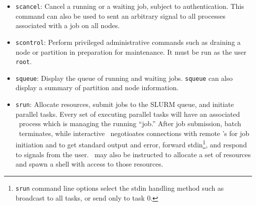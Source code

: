 \begin{itemize}
\item {\tt scancel}: Cancel a running or a waiting job, subject to
authentication. This command can also be used to sent an arbitrary 
signal to all processes associated with a job on all nodes.

\item {\tt scontrol}: Perform privileged administrative commands
such as draining a node or partition in preparation for maintenance. 
It must be run as the user {\tt root}.

\item {\tt squeue}: Display the queue of running and waiting jobs. 
{\tt squeue} can also display a summary of partition and node information.

\item {\tt srun}: Allocate resources, submit jobs to the SLURM queue,
and initiate parallel tasks. Every set of executing parallel tasks will
have an associated \srun\ process which is managing the running ``job.''
After job submission, batch \srun\ terminates, while interactive \srun\
negotioates connections with remote \slurmd 's for job initiation and to
get standard output and error, forward stdin\footnote{{\tt srun} command
line options select the stdin handling method such as broadcast to all
tasks, or send only to task 0.}, and respond to signals from the user.
\srun\ may also be instructed to allocate a set of resources and
spawn a shell with access to those resources.


\end{itemize}


